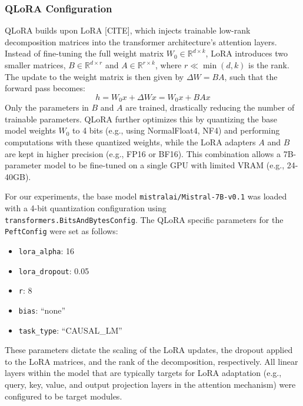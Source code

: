 \documentclass[11pt]{article}
\begin{document}
\subsubsection{QLoRA Configuration}
QLoRA builds upon LoRA [CITE], which injects trainable low-rank decomposition matrices into the transformer architecture's attention layers. Instead of fine-tuning the full weight matrix $W_0 \in \mathbb{R}^{d \times k}$, LoRA introduces two smaller matrices, $B \in \mathbb{R}^{d \times r}$ and $A \in \mathbb{R}^{r \times k}$, where $r \ll \min(d, k)$ is the rank. The update to the weight matrix is then given by $\Delta W = BA$, such that the forward pass becomes:
\begin{equation*}
    h = W_0 x + \Delta W x = W_0 x + BAx
\end{equation*}
Only the parameters in $B$ and $A$ are trained, drastically reducing the number of trainable parameters. QLoRA further optimizes this by quantizing the base model weights $W_0$ to 4 bits (e.g., using NormalFloat4, NF4) and performing computations with these quantized weights, while the LoRA adapters $A$ and $B$ are kept in higher precision (e.g., FP16 or BF16). This combination allows a 7B-parameter model to be fine-tuned on a single GPU with limited VRAM (e.g., 24-40GB).

For our experiments, the base model \texttt{mistralai/Mistral-7B-v0.1} was loaded with a 4-bit quantization configuration using \texttt{transformers.BitsAndBytesConfig}. The QLoRA specific parameters for the \texttt{PeftConfig} were set as follows:
\begin{itemize}
    \item \texttt{lora\_alpha}: 16
    \item \texttt{lora\_dropout}: 0.05
    \item \texttt{r}: 8
    \item \texttt{bias}: ``none''
    \item \texttt{task\_type}: ``CAUSAL\_LM''
\end{itemize}
These parameters dictate the scaling of the LoRA updates, the dropout applied to the LoRA matrices, and the rank of the decomposition, respectively. All linear layers within the model that are typically targets for LoRA adaptation (e.g., query, key, value, and output projection layers in the attention mechanism) were configured to be target modules.
\end{document}
